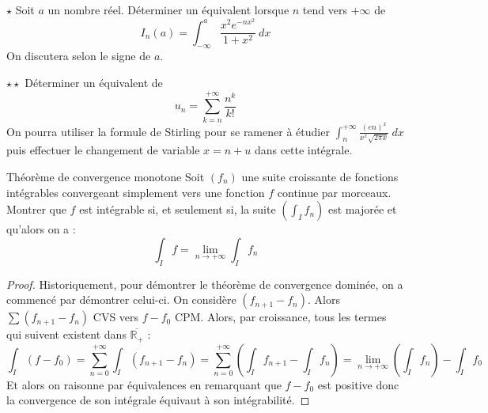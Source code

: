 \documentclass[french,a4paper]{article}
\newcommand{\R}{\mathbb{R}}
\theoremstyle{plain}
\theoremstyle{definition}
\theoremstyle{remark}
\begin{document}
\begin{ex}[Moulin.IP.15]{$\star$}
	Soit $a$ un nombre réel. Déterminer un équivalent lorsque $n$ tend vers $+\infty$ de $$I_n(a)=\int_{-\infty}^{a}\frac{x^2e^{-nx^2}}{1+x^2}\ dx$$ On discutera selon le signe de $a$.
\end{ex}

\begin{ex}[Moulin.IP.16]{$\star\star$}
	Déterminer un équivalent de $$u_n=\displaystyle\sum_{k=n}^{+\infty}\frac{n^k}{k!}$$ On pourra utiliser la formule de Stirling pour se ramener à étudier $\displaystyle\int_{n}^{+\infty}\frac{(en)^x}{x^x\sqrt{2\pi x}}\ dx$ puis effectuer le changement de variable $x=n+u$ dans cette intégrale.
\end{ex}

\begin{ex}[Moulin.IP.17]{Théorème de convergence monotone}
	Soit $(f_n)$ une suite croissante de fonctions intégrables convergeant simplement vers une fonction $f$ continue par morceaux. Montrer que $f$ est intégrable si, et seulement si, la suite $\left(\displaystyle\int_{I}f_n\right)$ est majorée et qu'alors on a : $$\int_{I}f=\lim_{n\to+\infty}\int_I f_n$$
\end{ex}
\begin{proof}
	Historiquement, pour démontrer le théorème de convergence dominée, on a commencé par démontrer celui-ci. On considère $(f_{n+1}-f_n)$. Alors $\sum(f_{n+1}-f_n)$ CVS vers $f-f_0$ CPM. Alors, par croissance, tous les termes qui suivent existent dans $\overline{\R_+}$ : $$\int_I (f-f_0)=\sum_{n=0}^{+\infty}\int_I(f_{n+1}-f_n)=\sum_{n=0}^{+\infty}\left(\int_I f_{n+1}-\int_I f_n\right)=\lim_{n\to+\infty}\left(\int_I f_n\right)-\int_If_0$$ Et alors on raisonne par équivalences en remarquant que $f-f_0$ est positive donc la convergence de son intégrale équivaut à son intégrabilité.
\end{proof}
\end{document}
